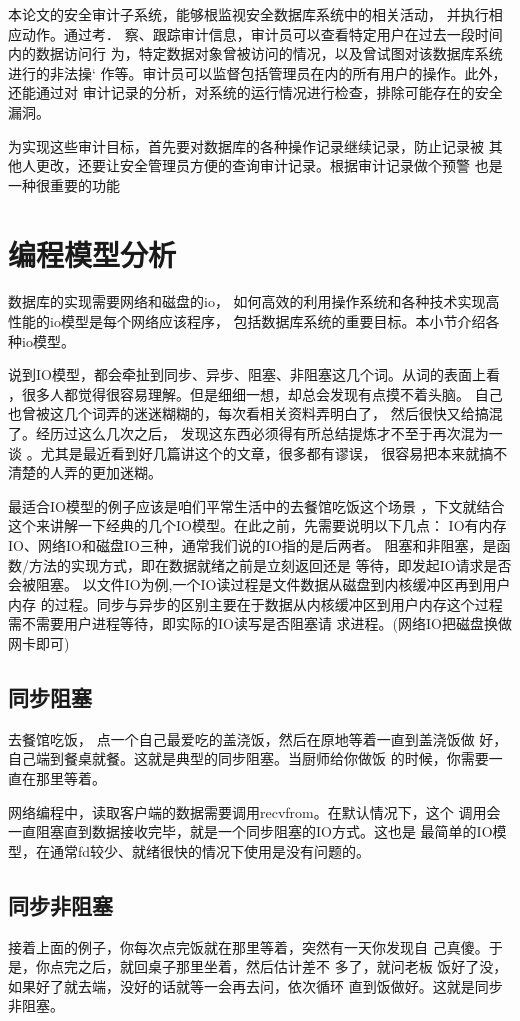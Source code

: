 本论文的安全审计子系统，能够根监视安全数据库系统中的相关活动，
并执行相应动作。通过考．
察、跟踪审计信息，审计员可以查看特定用户在过去一段时间内的数据访问行
为，特定数据对象曾被访问的情况，以及曾试图对该数据库系统进行的非法操‘
作等。审计员可以监督包括管理员在内的所有用户的操作。此外，还能通过对
审计记录的分析，对系统的运行情况进行检查，排除可能存在的安全漏洞。

为实现这些审计目标，首先要对数据库的各种操作记录继续记录，防止记录被
其他人更改，还要让安全管理员方便的查询审计记录。根据审计记录做个预警
也是一种很重要的功能
\section{编程模型分析}
数据库的实现需要网络和磁盘的io，
如何高效的利用操作系统和各种技术实现高性能的io模型是每个网络应该程序，
包括数据库系统的重要目标。本小节介绍各种io模型。

说到IO模型，都会牵扯到同步、异步、阻塞、非阻塞这几个词。从词的表面上看
，很多人都觉得很容易理解。但是细细一想，却总会发现有点摸不着头脑。
自己也曾被这几个词弄的迷迷糊糊的，每次看相关资料弄明白了，
然后很快又给搞混了。经历过这么几次之后，
发现这东西必须得有所总结提炼才不至于再次混为一谈
。尤其是最近看到好几篇讲这个的文章，很多都有谬误，
很容易把本来就搞不清楚的人弄的更加迷糊。

最适合IO模型的例子应该是咱们平常生活中的去餐馆吃饭这个场景
，下文就结合这个来讲解一下经典的几个IO模型。在此之前，先需要说明以下几点：
IO有内存IO、网络IO和磁盘IO三种，通常我们说的IO指的是后两者。
阻塞和非阻塞，是函数/方法的实现方式，即在数据就绪之前是立刻返回还是
等待，即发起IO请求是否会被阻塞。
以文件IO为例,一个IO读过程是文件数据从磁盘到内核缓冲区再到用户内存
的过程。同步与异步的区别主要在于数据从内核缓冲区到用户内存这个过程
需不需要用户进程等待，即实际的IO读写是否阻塞请
求进程。(网络IO把磁盘换做网卡即可)
\subsection{同步阻塞}
	 去餐馆吃饭，
	点一个自己最爱吃的盖浇饭，然后在原地等着一直到盖浇饭做
	好，自己端到餐桌就餐。这就是典型的同步阻塞。当厨师给你做饭
	的时候，你需要一直在那里等着。
	
	网络编程中，读取客户端的数据需要调用recvfrom。在默认情况下，这个
	调用会一直阻塞直到数据接收完毕，就是一个同步阻塞的IO方式。这也是
	最简单的IO模型，在通常fd较少、就绪很快的情况下使用是没有问题的。
	
 \subsection{同步非阻塞}
	接着上面的例子，你每次点完饭就在那里等着，突然有一天你发现自
	己真傻。于是，你点完之后，就回桌子那里坐着，然后估计差不
	多了，就问老板
	饭好了没，如果好了就去端，没好的话就等一会再去问，依次循环
	直到饭做好。这就是同步非阻塞。
	
